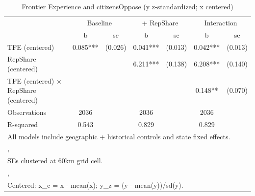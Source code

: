 \begin{table}[htbp]\centering
\def\sym#1{\ifmmode^{#1}\else\(^{#1}\)\fi}
\caption{Frontier Experience and citizensOppose (y z-standardized; x centered)}
\begin{tabular}{l*{3}{cc}}
\toprule
                &\multicolumn{2}{c}{Baseline}&\multicolumn{2}{c}{ + RepShare}&\multicolumn{2}{c}{Interaction}\\
                &        b   &       se&        b   &       se&        b   &       se\\
\midrule
TFE (centered)  &    0.085***&  (0.026)&    0.041***&  (0.013)&    0.042***&  (0.013)\\
RepShare (centered)&            &         &    6.211***&  (0.138)&    6.208***&  (0.140)\\
TFE (centered) $\times$ RepShare (centered)&            &         &            &         &    0.148** &  (0.070)\\
\midrule
Observations    &     2036   &         &     2036   &         &     2036   &         \\
R-squared       &    0.543   &         &    0.829   &         &    0.829   &         \\
\bottomrule
\multicolumn{7}{l}{\footnotesize All models include geographic + historical controls and state fixed effects.}\\
\multicolumn{7}{l}{\footnotesize ,}\\
\multicolumn{7}{l}{\footnotesize SEs clustered at 60km grid cell.}\\
\multicolumn{7}{l}{\footnotesize ,}\\
\multicolumn{7}{l}{\footnotesize Centered: x\_c = x - mean(x); y\_z = (y - mean(y))/sd(y).}\\
\end{tabular}
\end{table}
